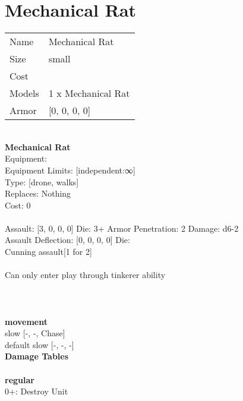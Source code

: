 \pagebreak\pagebreak

\section{ Mechanical Rat }

\begin{tabular}{ll}
  Name & Mechanical Rat \\
  Size & small\\
  Cost & \\
  Models & 1 x Mechanical Rat\\
  Armor & [0, 0, 0, 0]\\
\end{tabular}

\noindent \\ 


{\bf Mechanical Rat } \\
Equipment:  \\
Equipment Limits: [independent:∞] \\
Type: [drone, walks] \\
Replaces: Nothing \\
Cost: 0\\
\ \\
Assault: [3, 0, 0, 0] Die: 3+ Armor Penetration: 2 Damage: d6-2 \\
Assault Deflection: [0, 0, 0, 0] Die: \\
\indent Cunning assault[1 for 2]\\ 
 
\ \\
Can only enter play through tinkerer ability\\ 

\ \\
 
\ \\



\ \\ {\bf movement } \\
slow [-, -, Chase] \\
default slow [-, -, -] \\


{\bf Damage Tables} \\
\ \\ {\bf regular } \\
0+: Destroy Unit \\










